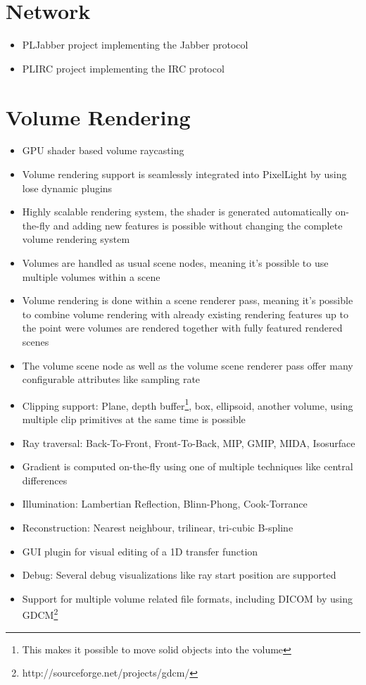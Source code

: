 \section{Network}
\begin{itemize}
\item{PLJabber project implementing the Jabber protocol}
\item{PLIRC project implementing the IRC protocol}
\end{itemize}




\section{Volume Rendering}
\begin{itemize}
\item{\ac{GPU} shader based volume raycasting}
\item{Volume rendering support is seamlessly integrated into PixelLight by using lose dynamic plugins}
\item{Highly scalable rendering system, the shader is generated automatically on-the-fly and adding new features is possible without changing the complete volume rendering system}
\item{Volumes are handled as usual scene nodes, meaning it's possible to use multiple volumes within a scene}
\item{Volume rendering is done within a scene renderer pass, meaning it's possible to combine volume rendering with already existing rendering features up to the point were volumes are rendered together with fully featured rendered scenes}
\item{The volume scene node as well as the volume scene renderer pass offer many configurable attributes like sampling rate}
\item{Clipping support: Plane, depth buffer\footnote{This makes it possible to move solid objects into the volume}, box, ellipsoid, another volume, using multiple clip primitives at the same time is possible}
\item{Ray traversal: Back-To-Front, Front-To-Back, \ac{MIP}, \ac{GMIP}, \ac{MIDA}, Isosurface}
\item{Gradient is computed on-the-fly using one of multiple techniques like central differences}
\item{Illumination: Lambertian Reflection, Blinn-Phong, Cook-Torrance}
\item{Reconstruction: Nearest neighbour, trilinear, tri-cubic B-spline}
\item{\ac{GUI} plugin for visual editing of a 1D transfer function}
\item{Debug: Several debug visualizations like ray start position are supported}
\item{Support for multiple volume related file formats, including \ac{DICOM} by using GDCM\footnote{http://sourceforge.net/projects/gdcm/}}
\end{itemize}
